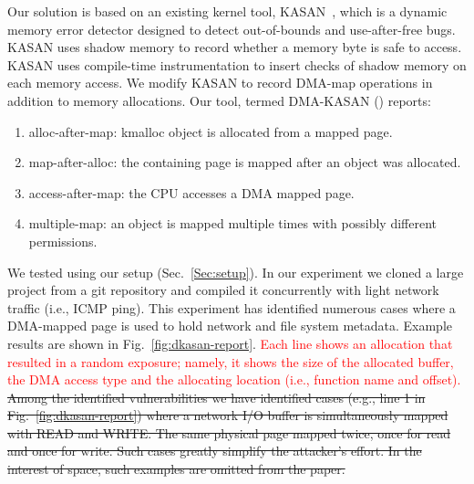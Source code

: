 Our solution is based on an existing kernel tool, KASAN~\cite{kasan}, which is a dynamic memory error detector designed to detect out-of-bounds and use-after-free bugs. KASAN uses shadow memory to record whether a memory byte is safe to access. KASAN uses compile-time instrumentation to insert checks of shadow memory on each memory access. 
We modify KASAN to record DMA-map operations in addition to memory allocations. Our tool, termed DMA-KASAN (\dkasan) reports: 
\begin{enumerate}
    \item alloc-after-map:  kmalloc object is allocated from a mapped page.
    \item map-after-alloc:  the containing page is mapped after an object was allocated.
    \item access-after-map: the CPU accesses a DMA mapped page.
    \item multiple-map: an object is mapped multiple times with possibly different permissions.
\end{enumerate}
We tested \dkasan using our setup (Sec.~\ref{Sec:setup}).
In our experiment we cloned a large project from a git repository and compiled it concurrently with light network traffic (i.e., ICMP ping). This experiment has identified numerous cases where a DMA-mapped page is used to hold network and file system metadata. Example results are shown in Fig.~\ref{fig:dkasan-report}. \textcolor{red}{Each line shows an allocation that resulted in a random exposure; namely, it shows the size of the allocated buffer, the DMA access type and the allocating location (i.e., function name and offset).}
\sout{Among the identified vulnerabilities we have identified cases (e.g., line 1 in Fig.~\ref{fig:dkasan-report}) where a network I/O buffer is simultaneously mapped with READ and WRITE. The same physical page mapped twice, once for read and once for write. Such cases greatly simplify the attacker's effort. In the interest of space, such examples are omitted from the paper.}

